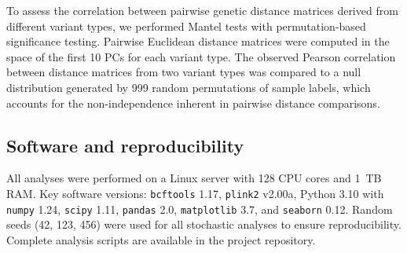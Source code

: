 To assess the correlation between pairwise genetic distance matrices derived from different variant types, we performed Mantel tests \citep{mantel1967} with permutation-based significance testing. Pairwise Euclidean distance matrices were computed in the space of the first 10 PCs for each variant type. The observed Pearson correlation between distance matrices from two variant types was compared to a null distribution generated by 999 random permutations of sample labels, which accounts for the non-independence inherent in pairwise distance comparisons.

\subsection*{Software and reproducibility}

All analyses were performed on a Linux server with 128 CPU cores and 1~TB RAM. Key software versions: \texttt{bcftools} 1.17, \texttt{plink2} v2.00a, Python 3.10 with \texttt{numpy} 1.24, \texttt{scipy} 1.11, \texttt{pandas} 2.0, \texttt{matplotlib} 3.7, and \texttt{seaborn} 0.12. Random seeds (42, 123, 456) were used for all stochastic analyses to ensure reproducibility. Complete analysis scripts are available in the project repository.
